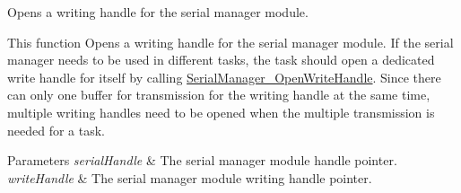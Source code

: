 Opens a writing handle for the serial manager module. 

This function Opens a writing handle for the serial manager module. If the serial manager needs to be used in different tasks, the task should open a dedicated write handle for itself by calling \mbox{\hyperlink{group__serialmanager_ga3d26249a8331e6ca17e9c60838b56d20}{Serial\+Manager\+\_\+\+Open\+Write\+Handle}}. Since there can only one buffer for transmission for the writing handle at the same time, multiple writing handles need to be opened when the multiple transmission is needed for a task.


\begin{DoxyParams}{Parameters}
{\em serial\+Handle} & The serial manager module handle pointer. \\
\hline
{\em write\+Handle} & The serial manager module writing handle pointer. \\
\hline
\end{DoxyParams}

